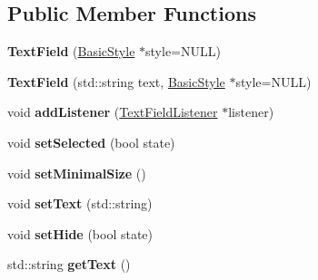 \subsection*{Public Member Functions}
\begin{DoxyCompactItemize}
\item 
\hypertarget{classgraphics_1_1_text_field_ac9a51870d8ac84386e40cf0b6fe3cf6f}{{\bfseries Text\-Field} (\hyperlink{classgraphics_1_1_basic_style}{Basic\-Style} $\ast$style=N\-U\-L\-L)}\label{classgraphics_1_1_text_field_ac9a51870d8ac84386e40cf0b6fe3cf6f}

\item 
\hypertarget{classgraphics_1_1_text_field_a8d453679fd79ab70f6e4ce99cbfcc94c}{{\bfseries Text\-Field} (std\-::string text, \hyperlink{classgraphics_1_1_basic_style}{Basic\-Style} $\ast$style=N\-U\-L\-L)}\label{classgraphics_1_1_text_field_a8d453679fd79ab70f6e4ce99cbfcc94c}

\item 
\hypertarget{classgraphics_1_1_text_field_aaa27c1b705536283712ec09d07b4e861}{void {\bfseries add\-Listener} (\hyperlink{classgraphics_1_1_text_field_listener}{Text\-Field\-Listener} $\ast$listener)}\label{classgraphics_1_1_text_field_aaa27c1b705536283712ec09d07b4e861}

\item 
\hypertarget{classgraphics_1_1_text_field_a4f31e300d692db9232ff89571a881e82}{void {\bfseries set\-Selected} (bool state)}\label{classgraphics_1_1_text_field_a4f31e300d692db9232ff89571a881e82}

\item 
\hypertarget{classgraphics_1_1_text_field_a1fb7d61118e69ef6263b683c2aa53fd3}{void {\bfseries set\-Minimal\-Size} ()}\label{classgraphics_1_1_text_field_a1fb7d61118e69ef6263b683c2aa53fd3}

\item 
\hypertarget{classgraphics_1_1_text_field_af9d3a35bbce7ca810427deb04147b4b9}{void {\bfseries set\-Text} (std\-::string)}\label{classgraphics_1_1_text_field_af9d3a35bbce7ca810427deb04147b4b9}

\item 
\hypertarget{classgraphics_1_1_text_field_a38e425a0d089b9eee196438ae4e3846e}{void {\bfseries set\-Hide} (bool state)}\label{classgraphics_1_1_text_field_a38e425a0d089b9eee196438ae4e3846e}

\item 
\hypertarget{classgraphics_1_1_text_field_a4cc63a3ad4d210f53a49d1edd2bc4f77}{std\-::string {\bfseries get\-Text} ()}\label{classgraphics_1_1_text_field_a4cc63a3ad4d210f53a49d1edd2bc4f77}


\end{DoxyCompactItemize}
